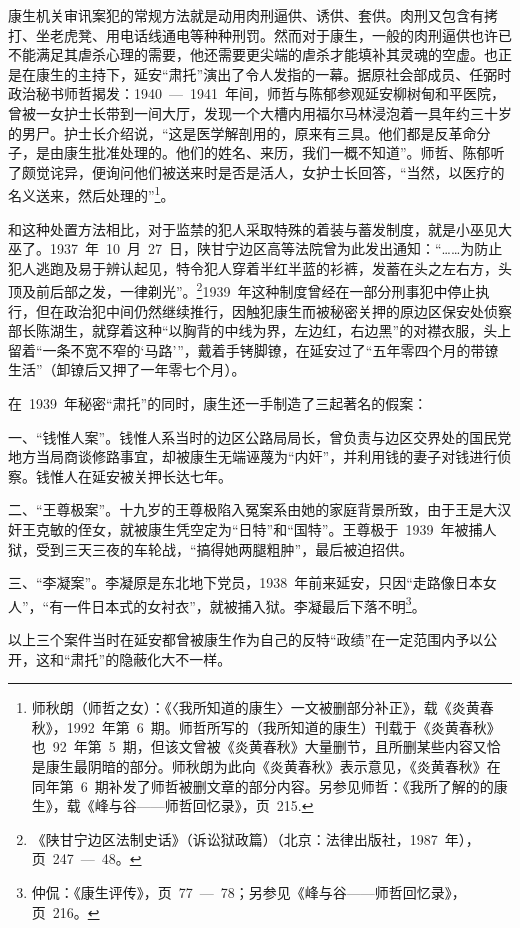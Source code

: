 康生机关审讯案犯的常规方法就是动用肉刑逼供、诱供、套供。肉刑又包含有拷打、坐老虎凳、用电话线通电等种种刑罚。然而对于康生，一般的肉刑逼供也许已不能满足其虐杀心理的需要，他还需要更尖端的虐杀才能填补其灵魂的空虚。也正是在康生的主持下，延安“肃托”演出了令人发指的一幕。据原社会部成员、任弼时政治秘书师哲揭发：1940~—~1941~年间，师哲与陈郁参观延安柳树甸和平医院，曾被一女护士长带到一间大厅，发现一个大槽内用福尔马林浸泡着一具年约三十岁的男尸。护士长介绍说，“这是医学解剖用的，原来有三具。他们都是反革命分子，是由康生批准处理的。他们的姓名、来历，我们一概不知道”。师哲、陈郁听了颇觉诧异，便询问他们被送来时是否是活人，女护士长回答，“当然，以医疗的名义送来，然后处理的”\footnote{师秋朗（师哲之女）：《〈我所知道的康生〉一文被删部分补正》，载《炎黄春秋》，1992~年第~6~期。师哲所写的（我所知道的康生）刊载于《炎黄春秋》也~92~年第~5~期，但该文曾被《炎黄春秋》大量删节，且所删某些内容又恰是康生最阴暗的部分。师秋朗为此向《炎黄春秋》表示意见，《炎黄春秋》在同年第~6~期补发了师哲被删文章的部分内容。另参见师哲：《我所了解的的康生》，载《峰与谷——师哲回忆录》，页~215.}。

和这种处置方法相比，对于监禁的犯人采取特殊的着装与蓄发制度，就是小巫见大巫了。1937~年~10~月~27~日，陕甘宁边区高等法院曾为此发出通知：“……为防止犯人逃跑及易于辨认起见，特令犯人穿着半红半蓝的衫裤，发蓄在头之左右方，头顶及前后部之发，一律剃光”。\footnote{《陕甘宁边区法制史话》（诉讼狱政篇）（北京：法律出版社，1987~年），页~247~—~48。}1939~年这种制度曾经在一部分刑事犯中停止执行，但在政治犯中间仍然继续推行，因触犯康生而被秘密关押的原边区保安处侦察部长陈湖生，就穿着这种“以胸背的中线为界，左边红，右边黑”的对襟衣服，头上留着“一条不宽不窄的‘马路’”，戴着手铐脚镣，在延安过了“五年零四个月的带镣生活”（卸镣后又押了一年零七个月）。

在~1939~年秘密“肃托”的同时，康生还一手制造了三起著名的假案：

一、“钱惟人案”。钱惟人系当时的边区公路局局长，曾负责与边区交界处的国民党地方当局商谈修路事宜，却被康生无端诬蔑为“内奸”，并利用钱的妻子对钱进行侦察。钱惟人在延安被关押长达七年。

二、“王尊极案”。十九岁的王尊极陷入冤案系由她的家庭背景所致，由于王是大汉奸王克敏的侄女，就被康生凭空定为“日特”和“国特”。王尊极于~1939~年被捕人狱，受到三天三夜的车轮战，“搞得她两腿粗肿”，最后被迫招供。

三、“李凝案”。李凝原是东北地下党员，1938~年前来延安，只因“走路像日本女人”，“有一件日本式的女衬衣”，就被捕入狱。李凝最后下落不明\footnote{仲侃：《康生评传》，页~77~—~78；另参见《峰与谷——师哲回忆录》，页~216。}。

以上三个案件当时在延安都曾被康生作为自己的反特“政绩”在一定范围内予以公开，这和“肃托”的隐蔽化大不一样。


